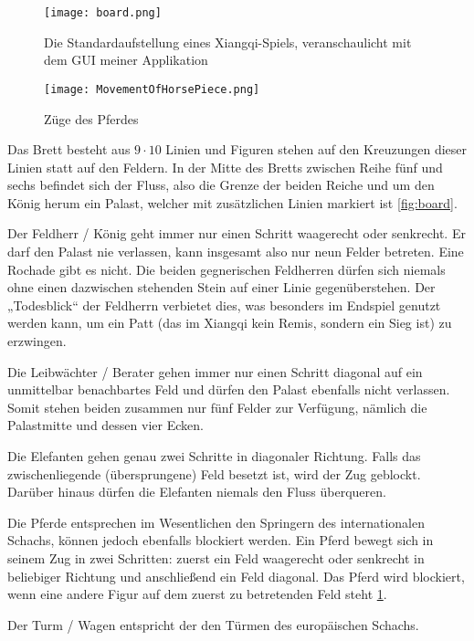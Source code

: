 \documentclass{jpp}
\begin{document}
\begin{figure}
  \centering
  \begin{minipage}[b]{0.49\textwidth}
    \texttt{[image: board.png]}
    \caption{Die Standardaufstellung eines Xiangqi-Spiels, veranschaulicht mit dem GUI meiner Applikation}
    \label{fig:board}
  \end{minipage}
  \hfill
  \begin{minipage}[b]{0.49\textwidth}
    \texttt{[image: MovementOfHorsePiece.png]}
    \caption{Züge des Pferdes}
    \label{fig:Horse}
  \end{minipage}
\end{figure}
Das Brett besteht aus $9 \cdot 10$ Linien und Figuren stehen auf den Kreuzungen dieser Linien statt auf den Feldern. In der Mitte des Bretts zwischen Reihe fünf und sechs befindet sich der Fluss, also die Grenze der beiden Reiche und um den König herum ein Palast, welcher mit zusätzlichen Linien markiert ist \ref{fig:board}.


Der Feldherr / König geht immer nur einen Schritt waagerecht oder senkrecht. Er darf den Palast nie verlassen, kann insgesamt also nur neun Felder betreten. Eine Rochade gibt es nicht. Die beiden gegnerischen Feldherren dürfen sich niemals ohne einen dazwischen stehenden Stein auf einer Linie gegenüberstehen. Der „Todesblick“ der Feldherrn verbietet dies, was besonders im Endspiel genutzt werden kann, um ein Patt (das im Xiangqi kein Remis, sondern ein Sieg ist) zu erzwingen.

Die Leibwächter / Berater gehen immer nur einen Schritt diagonal auf ein unmittelbar benachbartes Feld und dürfen den Palast ebenfalls nicht verlassen. Somit stehen beiden zusammen nur fünf Felder zur Verfügung, nämlich die Palastmitte und dessen vier Ecken.

Die Elefanten gehen genau zwei Schritte in diagonaler Richtung. Falls das zwischenliegende (übersprungene) Feld besetzt ist, wird der Zug geblockt. Darüber hinaus dürfen die Elefanten niemals den Fluss überqueren.

Die Pferde entsprechen im Wesentlichen den Springern des internationalen Schachs, können jedoch ebenfalls blockiert werden. Ein Pferd bewegt sich in seinem Zug in zwei Schritten: zuerst ein Feld waagerecht oder senkrecht in beliebiger Richtung und anschließend ein Feld diagonal. Das Pferd wird blockiert, wenn eine andere Figur auf dem zuerst zu betretenden Feld steht \ref{fig:Horse}.

 Der Turm / Wagen entspricht der den Türmen des europäischen Schachs. 
 
\end{document}
